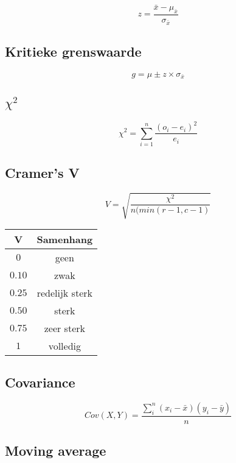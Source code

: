\documentclass[a4paper]{article}
\begin{document}
\begin{equation}
z = \frac{\bar{x} - \mu_{\bar{x}}}{\sigma_{\bar{x}}}
\end{equation}

\subsection{Kritieke grenswaarde}

\begin{equation}
g = \mu \pm z \times \sigma_{\bar{x}}
\end{equation}

\subsection{$\chi^2$}

\begin{equation}
\chi^2 = \sum_{i=1}^{n} \frac{(o_i - e_i)^2}{e_i}
\end{equation}

\subsection{Cramer's V}

\begin{equation}
V = \sqrt{\frac{\chi^2}{n(min(r - 1, c - 1)}}
\end{equation}

\begin{tabular}{c|c}
V & Samenhang \\ \hline
$0$ & geen \\ \hline
$0.10$ & zwak \\ \hline
$0.25$ & redelijk sterk \\ \hline
$0.50$ & sterk \\ \hline
$0.75$ & zeer sterk \\ \hline
$1$ & volledig \\
\end{tabular}

\subsection{Covariance}

\begin{equation}
Cov(X,Y) = \frac{\sum_i^n (x_i - \bar{x})(y_i - \bar{y})}{n}
\end{equation}

\subsection{Moving average}
\end{document}
